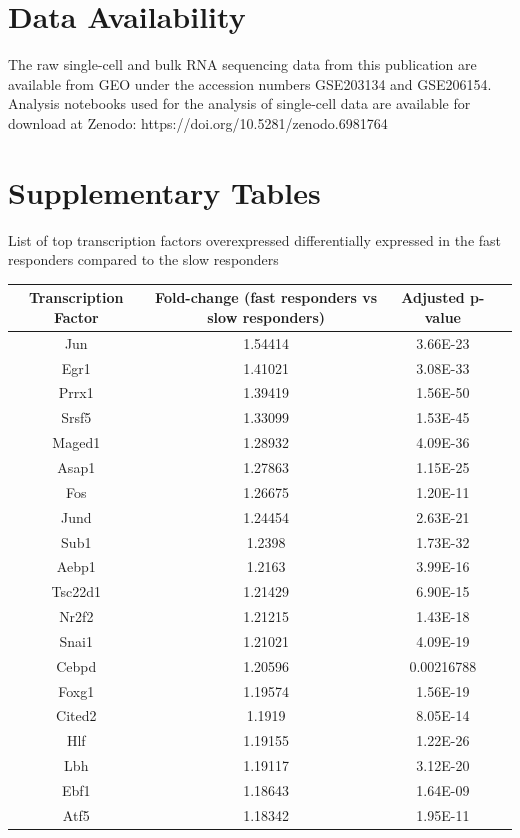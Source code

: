 \section{Data Availability}
The raw single-cell and bulk RNA sequencing data from this publication are available from GEO under the accession numbers GSE203134 and GSE206154. Analysis notebooks used for the analysis of single-cell data are available for download at Zenodo: https://doi.org/10.5281/zenodo.6981764



\clearpage
\section{Supplementary Tables}

\begin{supptable}[p]
\centering
\caption{List of top transcription factors overexpressed differentially expressed in the fast responders compared to the slow responders}
\begin{tabular}{ cccc }
\toprule
\textbf{Transcription Factor} & \textbf{Fold-change (fast responders vs slow responders)} & \textbf{Adjusted p-value} \\
\midrule
Jun & 1.54414 & 3.66E-23 \\
Egr1 & 1.41021 & 3.08E-33 \\
Prrx1 & 1.39419 & 1.56E-50 \\
Srsf5 & 1.33099 & 1.53E-45 \\
Maged1 & 1.28932 & 4.09E-36 \\
Asap1 & 1.27863 & 1.15E-25 \\
Fos & 1.26675 & 1.20E-11 \\
Jund & 1.24454 & 2.63E-21 \\
Sub1 & 1.2398 & 1.73E-32 \\
Aebp1 & 1.2163 & 3.99E-16 \\
Tsc22d1 & 1.21429 & 6.90E-15 \\
Nr2f2 & 1.21215 & 1.43E-18 \\
Snai1 & 1.21021 & 4.09E-19 \\
Cebpd & 1.20596 & 0.00216788 \\
Foxg1 & 1.19574 & 1.56E-19 \\
Cited2 & 1.1919 & 8.05E-14 \\
Hlf & 1.19155 & 1.22E-26 \\
Lbh & 1.19117 & 3.12E-20 \\
Ebf1 & 1.18643 & 1.64E-09 \\
Atf5 & 1.18342 & 1.95E-11 \\

\end{tabular}
\end{supptable}
